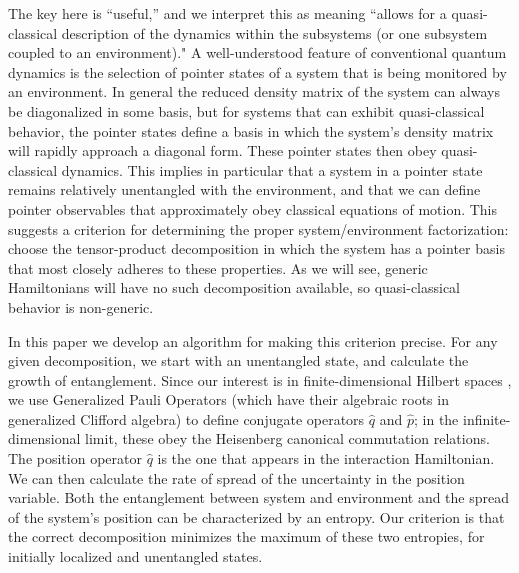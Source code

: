 \documentclass[aps,pra,onecolumn,nofootinbib,notitlepage,11pt,tightenlines]{revtex4-1}
\begin{document}
The key here is ``useful,'' and we interpret this as meaning ``allows for a quasi-classical description of the dynamics within the subsystems (or one subsystem coupled to an environment)."
A well-understood feature of conventional quantum dynamics is the selection of pointer states of a system that is being monitored by an environment. 
In general the reduced density matrix of the system can always be diagonalized in some basis, but for systems that can exhibit quasi-classical behavior, the pointer states define a basis in which the system's density matrix will rapidly approach a diagonal form.
These pointer states then obey quasi-classical dynamics.
This implies in particular that a system in a pointer state remains relatively unentangled with the environment, and that we can define pointer observables that approximately obey classical equations of motion. 
This suggests a criterion for determining the proper system/environment factorization: choose the tensor-product decomposition in which the system has a pointer basis that most closely adheres to these properties.
As we will see, generic Hamiltonians will have no such decomposition available, so quasi-classical behavior is non-generic.

In this paper we develop an algorithm for making this criterion precise.
For any given decomposition, we start with an unentangled state, and calculate the growth of entanglement.
Since our interest is in finite-dimensional Hilbert spaces \cite{Bao:2017rnv,Banks2000,Fischler2000}, we use Generalized Pauli Operators (which have their algebraic roots in generalized Clifford algebra) to define conjugate operators $\hat q$ and $\hat p$; in the infinite-dimensional limit, these obey the Heisenberg canonical commutation relations. 
The position operator $\hat q$ is the one that appears in the interaction Hamiltonian.
We can then calculate the rate of spread of the uncertainty in the position variable.
Both the entanglement between system and environment and the spread of the system's position can be characterized by an entropy.
Our criterion is that the correct decomposition minimizes the maximum of these two entropies, for initially localized and unentangled states.
\end{document}
